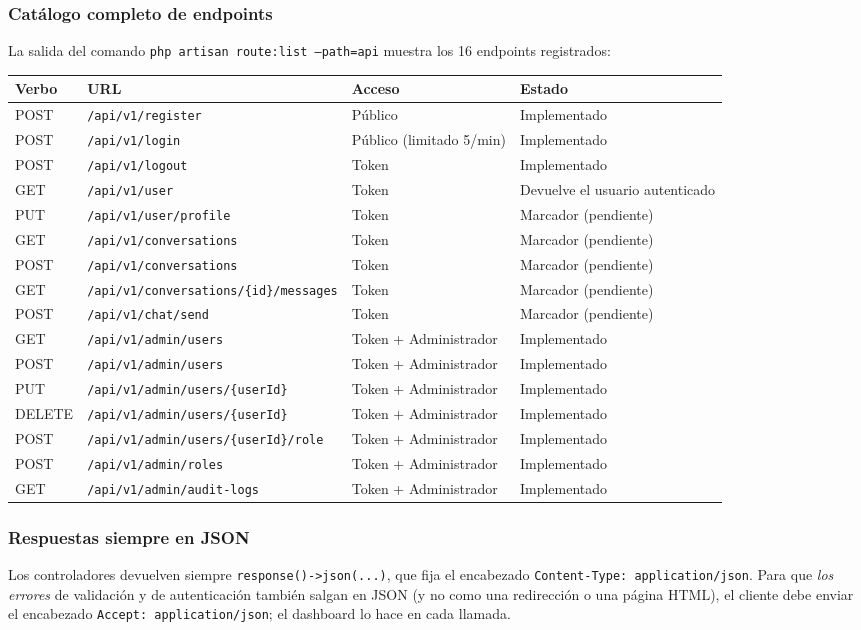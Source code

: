 \subsubsection{Catálogo completo de endpoints}
La salida del comando \texttt{php artisan route:list --path=api} muestra los 16 endpoints registrados:
\begin{longtable}{p{1.5cm}p{5.8cm}p{2.8cm}p{4.9cm}}
\toprule
\textbf{Verbo} & \textbf{URL} & \textbf{Acceso} & \textbf{Estado} \\
\midrule
\endhead
POST & \texttt{/api/v1/register} & Público & Implementado \\
POST & \texttt{/api/v1/login} & Público (limitado 5/min) & Implementado \\
POST & \texttt{/api/v1/logout} & Token & Implementado \\
GET & \texttt{/api/v1/user} & Token & Devuelve el usuario autenticado \\
PUT & \texttt{/api/v1/user/profile} & Token & Marcador (pendiente) \\
GET & \texttt{/api/v1/conversations} & Token & Marcador (pendiente) \\
POST & \texttt{/api/v1/conversations} & Token & Marcador (pendiente) \\
GET & \texttt{/api/v1/conversations/\{id\}/messages} & Token & Marcador (pendiente) \\
POST & \texttt{/api/v1/chat/send} & Token & Marcador (pendiente) \\
GET & \texttt{/api/v1/admin/users} & Token + Administrador & Implementado \\
POST & \texttt{/api/v1/admin/users} & Token + Administrador & Implementado \\
PUT & \texttt{/api/v1/admin/users/\{userId\}} & Token + Administrador & Implementado \\
DELETE & \texttt{/api/v1/admin/users/\{userId\}} & Token + Administrador & Implementado \\
POST & \texttt{/api/v1/admin/users/\{userId\}/role} & Token + Administrador & Implementado \\
POST & \texttt{/api/v1/admin/roles} & Token + Administrador & Implementado \\
GET & \texttt{/api/v1/admin/audit-logs} & Token + Administrador & Implementado \\
\bottomrule
\end{longtable}

\subsubsection{Respuestas siempre en JSON}
Los controladores devuelven siempre \texttt{response()->json(...)}, que fija el encabezado \texttt{Content-Type: application/json}. Para que \emph{los errores} de validación y de autenticación también salgan en JSON (y no como una redirección o una página HTML), el cliente debe enviar el encabezado \texttt{Accept: application/json}; el dashboard lo hace en cada llamada.

